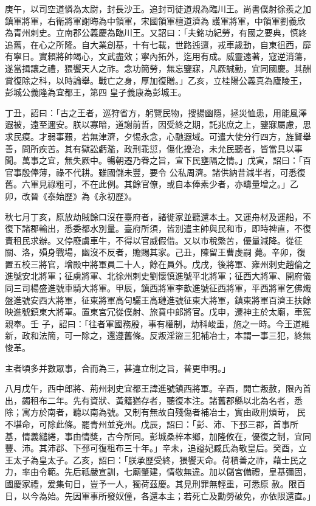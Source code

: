 \begin{pinyinscope}
 庚午，以司空道憐為太尉，封長沙王。追封司徒道規為臨川王。尚書僕射徐羨之加鎮軍將軍，右衛將軍謝晦為中領軍，宋國領軍檀道濟為
 護軍將軍，中領軍劉義欣為青州刺史。立南郡公義慶為臨川王。又詔曰：「夫銘功紀勞，有國之要典，慎終追舊，在心之所隆。自大業創基，十有七載，世路迍邅，戎車歲動，自東徂西，靡有寧日。實賴將帥竭心，文武盡效；寧內拓外，迄用有成。威靈遠著，寇逆消蕩，遂當揖讓之禮，猥饗天人之祚。念功簡勞，無忘鑒寐，凡厥誠勤，宜同國慶。其酬賞復除之科，以時論舉。戰亡之身，厚加復贈。」乙亥，立桂陽公義真為廬陵王，彭城公義隆為宜都王，第四
 皇子義康為彭城王。



 丁丑，詔曰：「古之王者，巡狩省方，躬覽民物，搜揚幽隱，拯災恤患，用能風澤遐被，遠至邇安。朕以寡暗，道謝前哲，因受終之期，託兆庶之上，鑒寐屬慮，思求民瘼。才弱事艱，若無津濟，夕惕永念，心馳遐域。可遣大使分行四方，旌賢舉善，問所疾苦。其有獄訟虧濫，政刑乖愆，傷化擾治，未允民聽者，皆當具以事聞。萬事之宜，無失厥中。暢朝遷乃眷之旨，宣下民壅隔之情。」戊寅，詔曰：「百官事殷俸薄，祿不代耕。雖國儲未豐，要令
 公私周濟。諸供納昔減半者，可悉復舊。六軍見祿粗可，不在此例。其餘官僚，或自本俸素少者，亦疇量增之。」乙卯，改晉《泰始歷》為《永初歷》。



 秋七月丁亥，原放劫賊餘口沒在臺府者，諸徙家並聽還本土。又運舟材及運船，不復下諸郡輸出，悉委都水別量。臺府所須，皆別遣主帥與民和市，即時裨直，不復責租民求辦。又停廢虜車牛，不得以官威假借。又以市稅繁苦，優量減降。從征關、洛，殞身戰場，幽沒不反者，贍賜其家。己丑，陳留王曹虔嗣
 薨。辛卯，復置五校三將官，增殿中將軍員二十人，餘在員外。戊戌，後將軍、雍州刺史趙倫之進號安北將軍；征虜將軍、北徐州刺史劉懷慎進號平北將軍；征西大將軍、開府儀同三司楊盛進號車騎大將軍。甲辰，鎮西將軍李歆進號征西將軍，平西將軍乞佛熾盤進號安西大將軍，征東將軍高句驪王高璉進號征東大將軍，鎮東將軍百濟王扶餘映進號鎮東大將軍。置東宮冗從僕射、旅賁中郎將官。戊申，遷神主於太廟，車駕親奉。壬
 子，詔曰：「往者軍國務殷，事有權制，劫科峻重，施之一時。今王道維新，政和法簡，可一除之，還遵舊條。反叛淫盜三犯補冶士，本謂一事三犯，終無悛革。



 主者頃多并數眾事，合而為三，甚違立制之旨，普更申明。」



 八月戊午，西中郎將、荊州刺史宜都王諱進號鎮西將軍。辛酉，開亡叛赦，限內首出，蠲租布二年。先有資狀、黃籍猶存者，聽復本注。諸舊郡縣以北為名者，悉除；寓方於南者，聽以南為號。又制有無故自殘傷者補冶士，實由政刑煩苛，
 民不堪命，可除此條。罷青州並兗州。戊辰，詔曰：「彭、沛、下邳三郡，首事所基，情義繾綣，事由情獎，古今所同。彭城桑梓本鄉，加隆攸在，優復之制，宜同豐、沛。其沛郡、下邳可復租布三十年。」辛未，追謚妃臧氏為敬皇后。癸酉，立王太子為皇太子。乙亥，詔曰：「朕承歷受終，猥饗天命。荷積善之祚，藉士民之力，率由令範。先后祗嚴宣訓，七廟肇建，情敬無違。加以儲宮備禮，皇基彌固，國慶家禮，爰集旬日，豈予一人，獨荷茲慶。其見刑罪無輕重，可悉原
 赦。限百日，以今為始。先因軍事所發奴僮，各還本主；若死亡及勳勞破免，亦依限還直。」




\end{pinyinscope}
